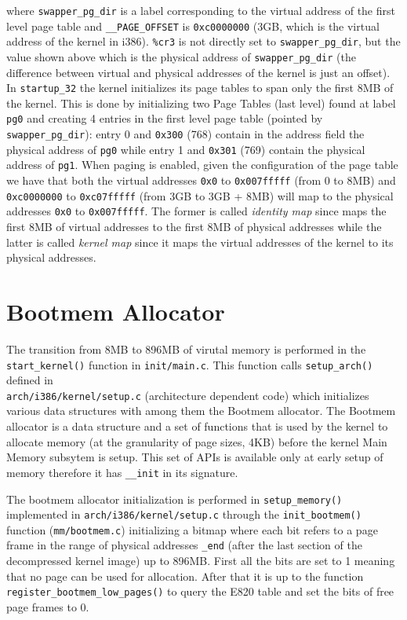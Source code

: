 \documentclass[twoside]{article}
\begin{document}
where \texttt{swapper_pg_dir} is a label corresponding to the virtual address of the first level page table and \texttt{__PAGE_OFFSET} is \texttt{0xc0000000} (3GB, which is the virtual address of the kernel in i386). \texttt{\%cr3} is not directly set to \texttt{swapper_pg_dir}, but the value shown above which is the physical address of \texttt{swapper_pg_dir} (the difference between virtual and physical addresses of the kernel is just an offset). In \texttt{startup_32} the kernel initializes its page tables
to span only the first 8MB of the kernel. This is done by initializing two Page Tables (last level) found at label \texttt{pg0} and creating 4 entries in the first level page table (pointed by \texttt{swapper_pg_dir}): entry 0 and \texttt{0x300} (768) contain in the address field the physical address of \texttt{pg0} while entry 1 and \texttt{0x301} (769) contain the
physical address of \texttt{pg1}. When paging is enabled, given the configuration of the page table we have that both the virtual addresses \texttt{0x0} to \texttt{0x007fffff} (from 0 to 8MB) and \texttt{0xc0000000} to \texttt{0xc07fffff} (from 3GB to 3GB + 8MB) will map to the physical addresses \texttt{0x0} to \texttt{0x007fffff}. The former is called \textit{identity map} since maps the first 8MB of virtual addresses to the first 8MB of physical addresses while the latter is
called \textit{kernel map} since it maps the virtual addresses of the kernel to its physical addresses.

\section{Bootmem Allocator}

The transition from 8MB to 896MB of virutal memory is performed in the \texttt{start_kernel()} function in \texttt{init/main.c}. This function calls \texttt{setup_arch()} defined in \\ 
\texttt{arch/i386/kernel/setup.c} (architecture dependent code) which initializes various data structures with among them the Bootmem allocator. The Bootmem allocator is a data structure and a set of functions that is used by the kernel to allocate memory (at the granularity of page sizes, 4KB) before the kernel Main Memory subsytem is setup. This set of APIs is available only at early setup of memory therefore it has \texttt{__init} in its signature.

The bootmem allocator initialization is performed in \texttt{setup_memory()}
implemented in \texttt{arch/i386/kernel/setup.c} through the
\texttt{init_bootmem()} function (\texttt{mm/bootmem.c}) initializing a bitmap
where each bit
refers to a page frame in the range of physical addresses \texttt{_end}
(after the last section of the decompressed kernel image) up to 896MB.
First all the bits are set to 1 meaning that no page can be used for
allocation. After that it is up to the function
\texttt{register_bootmem_low_pages()} to query the E820 table and set the bits
of free page frames to 0.
\end{document}
